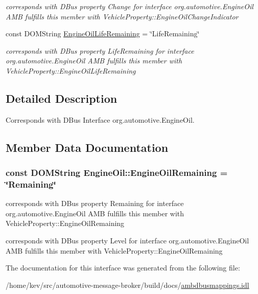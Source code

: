 \begin{DoxyCompactItemize}
\begin{DoxyCompactList}\small\item\em corresponds with D\+Bus property Change for interface org.\+automotive.\+Engine\+Oil A\+M\+B fulfills this member with Vehicle\+Property\+::\+Engine\+Oil\+Change\+Indicator \end{DoxyCompactList}\item 
\hypertarget{interfaceEngineOil_aaf63ba970af16d0c7d914b3c5dcdddc2}{const D\+O\+M\+String \hyperlink{interfaceEngineOil_aaf63ba970af16d0c7d914b3c5dcdddc2}{Engine\+Oil\+Life\+Remaining} = \char`\"{}Life\+Remaining\char`\"{}}\label{interfaceEngineOil_aaf63ba970af16d0c7d914b3c5dcdddc2}

\begin{DoxyCompactList}\small\item\em corresponds with D\+Bus property Life\+Remaining for interface org.\+automotive.\+Engine\+Oil A\+M\+B fulfills this member with Vehicle\+Property\+::\+Engine\+Oil\+Life\+Remaining \end{DoxyCompactList}\end{DoxyCompactItemize}


\subsection{Detailed Description}
Corresponds with D\+Bus Interface org.\+automotive.\+Engine\+Oil. 

\subsection{Member Data Documentation}
\hypertarget{interfaceEngineOil_a28a148b5fcbf4d61ab438f229870e997}{
\subsubsection[{Engine\+Oil\+Remaining}]{\setlength{\rightskip}{0pt plus 5cm}const D\+O\+M\+String Engine\+Oil\+::\+Engine\+Oil\+Remaining = \char`\"{}Remaining\char`\"{}}}\label{interfaceEngineOil_a28a148b5fcbf4d61ab438f229870e997}


corresponds with D\+Bus property Remaining for interface org.\+automotive.\+Engine\+Oil A\+M\+B fulfills this member with Vehicle\+Property\+::\+Engine\+Oil\+Remaining 

corresponds with D\+Bus property Level for interface org.\+automotive.\+Engine\+Oil A\+M\+B fulfills this member with Vehicle\+Property\+::\+Engine\+Oil\+Remaining 

The documentation for this interface was generated from the following file\+:\begin{DoxyCompactItemize}
\item 
/home/kev/src/automotive-\/message-\/broker/build/docs/\hyperlink{ambdbusmappings_8idl}{ambdbusmappings.\+idl}\end{DoxyCompactItemize}
